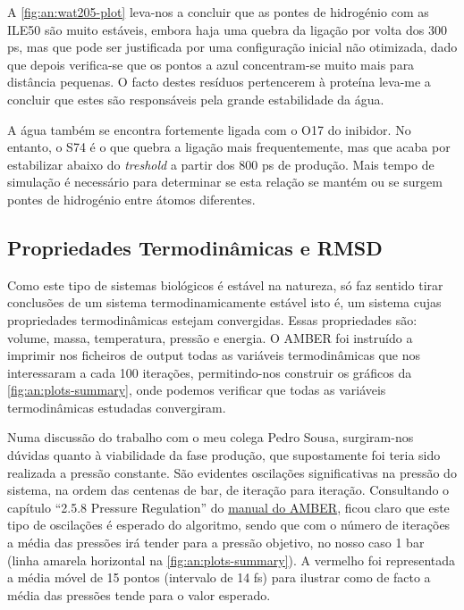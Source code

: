 \documentclass[12pt,a4paper]{article}
\begin{document}
	A \cref{fig:an:wat205-plot} leva-nos a concluir que as pontes de hidrogénio com as ILE50 são muito estáveis, embora haja uma quebra da ligação por volta dos 300 ps, mas que pode ser justificada por uma configuração inicial não otimizada, dado que depois verifica-se que os pontos a azul concentram-se muito mais para distância pequenas. O facto destes resíduos pertencerem à proteína leva-me a concluir que estes são responsáveis pela grande estabilidade da água. 
	
	A água também se encontra fortemente ligada com o O17 do inibidor. No entanto, o S74 é o que quebra a ligação mais frequentemente, mas que acaba por estabilizar abaixo do \textit{treshold} a partir dos 800 ps de produção. Mais tempo de simulação é necessário para determinar se esta relação se mantém ou se surgem pontes de hidrogénio entre átomos diferentes.

\subsection{Propriedades Termodinâmicas e RMSD}
	Como este tipo de sistemas biológicos é estável na natureza, só faz sentido tirar conclusões de um sistema termodinamicamente estável isto é, um sistema cujas propriedades termodinâmicas estejam convergidas. Essas propriedades são: volume, massa, temperatura, pressão e energia. O AMBER foi instruído a imprimir nos ficheiros de output todas as variáveis termodinâmicas que nos interessaram a cada 100 iterações, permitindo-nos construir os gráficos da \cref{fig:an:plots-summary}, onde podemos verificar que todas as variáveis termodinâmicas estudadas convergiram.
	
	Numa discussão do trabalho com o meu colega Pedro Sousa, surgiram-nos dúvidas quanto à viabilidade da fase produção, que supostamente foi teria sido realizada a pressão constante. São evidentes oscilações significativas na pressão do sistema, na ordem das centenas de bar, de iteração para iteração. Consultando o capítulo ``2.5.8 Pressure Regulation'' do \href{https://ambermd.org/doc12/Amber12.pdf}{manual do AMBER}, ficou claro que este tipo de oscilações é esperado do algoritmo, sendo que com o número de iterações a média das pressões irá tender para a pressão objetivo, no nosso caso 1 bar (linha amarela horizontal na \cref{fig:an:plots-summary}). A vermelho foi representada a média móvel de 15 pontos (intervalo de 14 fs) para ilustrar como de facto a média das pressões tende para o valor esperado.
	
\end{document}
